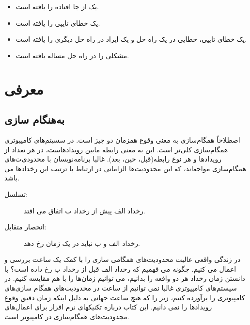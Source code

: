 \documentclass{book}
\newcommand{\clearemptydoublepage}{\newpage\cleardoublepage}
\begin{document}
\begin{itemize}
\item {}
    یک  از جا افتاده را یافته است. 

\item {} یک خطای تایپی را یافته است. 

\item {}    یک خطای تایپی، خطایی در یک راه حل و یک ایراد در راه حل دیگری را یافته است. 

\item {} 
    مشکلی را در راه حل مساله   یافته است. 

\end{itemize}


\tableofcontents
\clearemptydoublepage

\mainmatter


\chapter{معرفی}

\section{به‌هنگام سازی}
\label{synch}

اصطلاحاً همگام‌سازی به معنی وقوع همزمان دو چیز است. در سسیتم‌های کامپیوتری همگام‌سازی کلی‌تر است. این به معنی رابطه مابین رویدادهاست، در هر تعداد از رویدادها و هر نوع رابطه(قبل، حین، بعد).
غالبا برنامه‌نویسان با محدودی‌ت‌های همگام‌سازی مواجه‌اند، که این محدودیت‌ها الزاماتی در ارتباط با ترتیب این رخدادها می باشد.

\begin{description}

\item[تسلسل:] رخداد الف پیش از رخداد ب اتفاق می افتد.

\item[انحصار متقابل:] رخداد الف و ب نباید در یک زمان رخ دهد.

\end{description}
در زندگی واقعی عالبت محدودیت‌های همگامی سازی را با کمک یک ساعت بررسی و اعمال می کنیم. چگونه می فهمیم که رخداد الف قبل از رخداد ب رخ داده است؟ با دانستن زمان رخداد هر دو واقعه را بدانیم، می توانیم زمان‌ها را با هم مقایسه کنیم.
در سیستم‌های کامپیوتری غالبا نمی توانیم از ساعت در محدودیت‌های همگام سازی‌های کامپیوتری را برآورده کنیم، زیر را که هیچ ساعت جهانی به دلیل اینکه زمان دقیق وقوع رویدادها را نمی دانیم.
این کتاب درباره تکنیکهای نرم افزار برای اعمال‌های مجدودیت‌های همگام‌سازی در کامپیوتر است.
\end{document}
